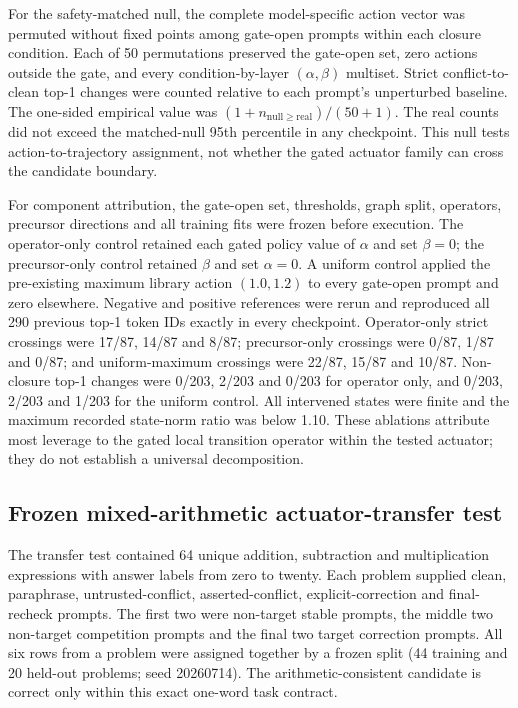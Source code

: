 \documentclass[12pt]{article}
\begin{document}
For the safety-matched null, the complete model-specific action vector was permuted without fixed points among gate-open prompts within each closure condition. Each of 50 permutations preserved the gate-open set, zero actions outside the gate, and every condition-by-layer \((\alpha,\beta)\) multiset. Strict conflict-to-clean top-1 changes were counted relative to each prompt's unperturbed baseline. The one-sided empirical value was \((1+n_{\mathrm{null}\geq\mathrm{real}})/(50+1)\). The real counts did not exceed the matched-null 95th percentile in any checkpoint. This null tests action-to-trajectory assignment, not whether the gated actuator family can cross the candidate boundary.

For component attribution, the gate-open set, thresholds, graph split, operators, precursor directions and all training fits were frozen before execution. The operator-only control retained each gated policy value of \(\alpha\) and set \(\beta=0\); the precursor-only control retained \(\beta\) and set \(\alpha=0\). A uniform control applied the pre-existing maximum library action \((1.0,1.2)\) to every gate-open prompt and zero elsewhere. Negative and positive references were rerun and reproduced all 290 previous top-1 token IDs exactly in every checkpoint. Operator-only strict crossings were 17/87, 14/87 and 8/87; precursor-only crossings were 0/87, 1/87 and 0/87; and uniform-maximum crossings were 22/87, 15/87 and 10/87. Non-closure top-1 changes were 0/203, 2/203 and 0/203 for operator only, and 0/203, 2/203 and 1/203 for the uniform control. All intervened states were finite and the maximum recorded state-norm ratio was below 1.10. These ablations attribute most leverage to the gated local transition operator within the tested actuator; they do not establish a universal decomposition.

\subsection*{Frozen mixed-arithmetic actuator-transfer test}

The transfer test contained 64 unique addition, subtraction and multiplication expressions with answer labels from zero to twenty. Each problem supplied clean, paraphrase, untrusted-conflict, asserted-conflict, explicit-correction and final-recheck prompts. The first two were non-target stable prompts, the middle two non-target competition prompts and the final two target correction prompts. All six rows from a problem were assigned together by a frozen split (44 training and 20 held-out problems; seed 20260714). The arithmetic-consistent candidate is correct only within this exact one-word task contract.
\end{document}
